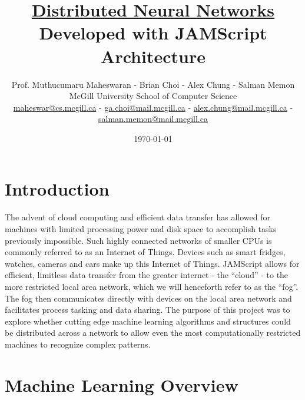 \documentclass{article}
\title{\underline{Distributed Neural Networks} \\ \large Developed with JAMScript Architecture}
\author{  Prof. Muthucumaru Maheswaran - Brian Choi -  Alex Chung - Salman Memon \\ \normalsize McGill University School of Computer Science \\  \small \underline{maheswar@cs.mcgill.ca} - \underline{ga.choi@mail.mcgill.ca} - \underline{alex.chung@mail.mcgill.ca} - \underline{salman.memon@mail.mcgill.ca}  }
\date{\today}
\begin{document}
\maketitle

\section{Introduction}

\begin{multicols}{2}
The advent of cloud computing and efficient data transfer has allowed for machines with limited processing power and disk space to accomplish tasks previously impossible. Such highly connected networks of smaller CPUs is commonly referred to as an Internet of Things. Devices such as smart fridges, watches, cameras and cars make up this Internet of Things. JAMScript allows for efficient, limitless data transfer from the greater internet - the “cloud” - to the more restricted local area network, which we will henceforth refer to as the “fog”. The fog then communicates directly with devices on the local area network and facilitates process tasking and data sharing. The purpose of this project was to explore whether cutting edge machine learning algorithms and structures could be distributed across a network to allow even the most computationally restricted machines to recognize complex patterns.

\end{multicols}

\section{Machine Learning Overview}
\end{document}
